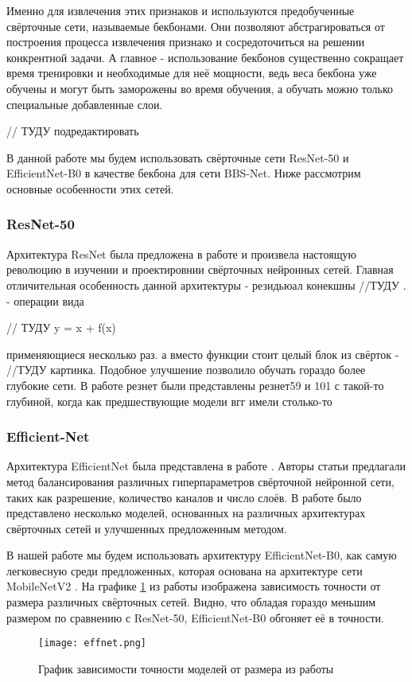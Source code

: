 Именно для извлечения этих признаков и используются предобученные свёрточные сети, называемые бекбонами. Они позволяют 
абстрагироваться от построения процесса извлечения признако и сосредоточиться на решении конкрентной задачи.
А главное - использование бекбонов существенно сокращает время тренировки и необходимые для неё мощности,
ведь веса бекбона уже обучены и могут быть заморожены во время обучения, а обучать можно только специальные добавленные слои.

// ТУДУ подредактировать

В данной работе мы будем использовать свёрточные сети ResNet-50\cite{ResNet} и EfficientNet-B0\cite{Efficientnet} 
в качестве бекбона для сети BBS-Net\cite{BBS}. Ниже рассмотрим основные особенности этих сетей.

\subsubsection{ResNet-50}

Архитектура ResNet была предложена в работе \cite{ResNet} и произвела настоящую революцию 
в изучении и проектировнии свёрточных нейронных сетей. Главная отличительная особенность данной архитектуры -
резидьюал конекшны //ТУДУ . - операции вида 

// ТУДУ y = x + f(x)


применяющиеся несколько раз. а вместо функции стоит целый блок из свёрток - //ТУДУ картинка.
Подобное улучшение позволило обучать гораздо более глубокие сети. 
В работе резнет были представлены резнет59 и 101 с такой-то глубиной, когда как предшествующие модели вгг имели столько-то 


\subsubsection{Efficient-Net}

Архитектура EfficientNet была представлена в работе \cite{Efficientnet}. Авторы статьи предлагали метод 
балансирования различных гиперпараметров свёрточной нейронной сети, таких как разрешение, количество каналов  и число слоёв.
В работе \cite{Efficientnet} было представлено несколько моделей, основанных на различных архитектурах свёрточных сетей
и улучшенных предложенным методом.

В нашей работе мы будем использовать архитектуру EfficientNet-B0, как самую легковесную среди предложенных,
которая основана на архитектуре сети MobileNetV2 \cite{MobileNetV2}. На графике \ref{fig:effent} из работы \cite{Efficientnet}
изображена зависимость точности от размера различных свёрточных сетей. Видно, что обладая гораздо меньшим размером 
по сравнению с ResNet-50, EfficientNet-B0 обгоняет её в точности.

 \begin{figure}[h]
    \centering
    \texttt{[image: effnet.png]}
    \caption{График зависимости точности моделей от размера из работы \cite{Efficientnet}}
    \label{fig:effent}
\end{figure}
